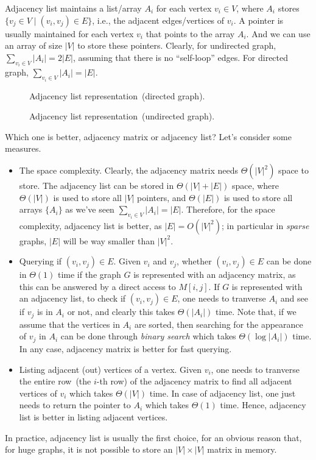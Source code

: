 Adjacency list maintains a list/array $A_i$ for each vertex $v_i \in V$, where
$A_i$ stores $\{v_j \in V \mid (v_i, v_j) \in E\}$, i.e., the adjacent edges/vertices of $v_i$.
A pointer is usually maintained for each vertex $v_i$ that points to the array $A_i$.
And we can use an array of size $|V|$ to store these pointers.
Clearly, for undirected graph, $\sum_{v_i \in V} |A_i| = 2|E|$, assuming that there is no ``self-loop'' edges.
For directed graph, $\sum_{v_i \in V} |A_i| = |E|$.

\begin{figure}[h!]
\centering{}
\caption{Adjacency list representation~(directed graph).}
\end{figure}

\begin{figure}[h!]
\centering{}
\caption{Adjacency list representation~(undirected graph).}
\end{figure}

Which one is better, adjacency matrix or adjacency list? 
Let's consider some measures.
\begin{itemize}
\item The space complexity. Clearly, the adjacency matrix needs $\Theta(|V|^2)$ space to store.
The adjacency list can be stored in $\Theta(|V| + |E|)$ space, where $\Theta(|V|)$ is used to
store all $|V|$ pointers, and $\Theta(|E|)$ is used to store all arrays $\{A_i\}$ as we've seen
$\sum_{v_i\in V} |A_i| = |E|$. Therefore, for the space complexity, adjacency list is better,
as $|E| = O(|V|^2)$; in particular in \emph{sparse} graphs, $|E|$ will be way smaller than $|V|^2$.

\item Querying if $(v_i,v_j)\in E$. Given $v_i$ and $v_j$, whether $(v_i,v_j)\in E$ can be done
in $\Theta(1)$ time if the graph $G$ is represented with an adjacency matrix, as this can be answered
by a direct access to $M[i,j]$.
If $G$ is represented with an adjacency list, to check if $(v_i,v_j)\in E$, one needs to tranverse
$A_i$ and see if $v_j$ is in $A_i$ or not, and clearly this takes $\Theta(|A_i|)$ time.
Note that, if we assume that the vertices in $A_i$ are sorted, then searching for the appearance of $v_j$
in $A_i$ can be done through \emph{binary search} which takes $\Theta(\log |A_i|)$ time.
In any case, adjacency matrix is better for fast querying.

\item Listing adjacent (out) vertices of a vertex. Given $v_i$, one needs to tranverse the entire row~(the $i$-th row) of the adjacency matrix
to find all adjacent vertices of $v_i$ which takes $\Theta(|V|)$ time.
In case of adjacency list, one just needs to return the pointer to $A_i$ which takes $\Theta(1)$ time.
Hence, adjacency list is better in listing adjacent vertices.

\end{itemize}

In practice, adjacency list is usually the first choice, for an obvious reason that, for huge graphs, it is not possible
to store an $|V|\times |V|$ matrix in memory.


